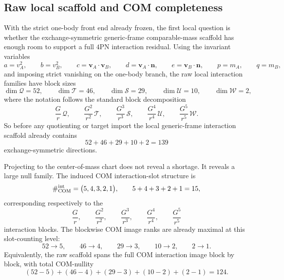 \documentclass[11pt]{article}
\begin{document}
\subsection{Raw local scaffold and COM completeness}
\label{sec:local-raw-scaffold}

With the strict one-body front end already frozen, the first local question is
whether the exchange-symmetric generic-frame comparable-mass scaffold has enough
room to support a full $4$PN interaction residual.  Using the invariant
variables
\[
a=v_A^2,
\qquad
b=v_B^2,
\qquad
c=\mathbf v_A\!\cdot\!\mathbf v_B,
\qquad
d=\mathbf v_A\!\cdot\!\mathbf n,
\qquad
e=\mathbf v_B\!\cdot\!\mathbf n,
\qquad
p=m_A,
\qquad
q=m_B,
\]
and imposing strict vanishing on the one-body branch, the raw local interaction
families have block sizes
\begin{equation}
\dim \mathcal Q = 52,
\qquad
\dim \mathcal T = 46,
\qquad
\dim \mathcal S = 29,
\qquad
\dim \mathcal U = 10,
\qquad
\dim \mathcal W = 2,
\label{eq:4pn-local-raw-block-sizes}
\end{equation}
where the notation follows the standard block decomposition
\[
\frac{G}{r}\,\mathcal Q,
\qquad
\frac{G^2}{r^2}\,\mathcal T,
\qquad
\frac{G^3}{r^3}\,\mathcal S,
\qquad
\frac{G^4}{r^4}\,\mathcal U,
\qquad
\frac{G^5}{r^5}\,\mathcal W.
\]
So before any quotienting or target import the local generic-frame interaction
scaffold already contains
\begin{equation}
52+46+29+10+2 = 139
\label{eq:4pn-local-raw-total}
\end{equation}
exchange-symmetric directions.

Projecting to the center-of-mass chart does not reveal a shortage.  It reveals a
large null family.  The induced COM interaction-slot structure is
\begin{equation}
\#_{\rm COM}^{\rm int}
=
\bigl(5,4,3,2,1\bigr),
\qquad
5+4+3+2+1 = 15,
\label{eq:4pn-local-com-slot-counts}
\end{equation}
corresponding respectively to the
\[
\frac{G}{r},
\qquad
\frac{G^2}{r^2},
\qquad
\frac{G^3}{r^3},
\qquad
\frac{G^4}{r^4},
\qquad
\frac{G^5}{r^5}
\]
interaction blocks.  The blockwise COM image ranks are already maximal at this
slot-counting level:
\begin{equation}
52\to 5,
\qquad
46\to 4,
\qquad
29\to 3,
\qquad
10\to 2,
\qquad
2\to 1.
\label{eq:4pn-local-com-slot-ranks}
\end{equation}
Equivalently, the raw scaffold spans the full COM interaction image block by
block, with total COM-nullity
\begin{equation}
(52-5)+(46-4)+(29-3)+(10-2)+(2-1)=124.
\label{eq:4pn-local-com-nullity-raw}
\end{equation}
\end{document}
